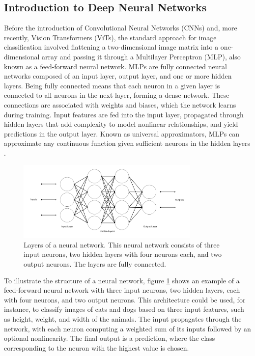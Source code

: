 
\subsection{Introduction to Deep Neural Networks}
\label{sec:intro_DNN}
Before the introduction of Convolutional Neural Networks (CNNs) and, more recently, Vision Transformers (ViTs), the standard approach for image classification involved flattening a two-dimensional image matrix into a one-dimensional array and passing it through a Multilayer Perceptron (MLP), also known as a feed-forward neural network. MLPs are fully connected neural networks composed of an input layer, output layer, and one or more hidden layers. Being fully connected means that each neuron in a given layer is connected to all neurons in the next layer, forming a dense network. These connections are associated with weights and biases, which the network learns during training. Input features are fed into the input layer, propagated through hidden layers that add complexity to model nonlinear relationships, and yield predictions in the output layer. Known as universal approximators, MLPs can approximate any continuous function given sufficient neurons in the hidden layers \cite{zhang2023dive,HORNIK1989359}.

\begin{figure}[ht]
    \centering
    \includegraphics[width=0.8\textwidth]{Images/cnn_layers.png} 
    \caption{Layers of a neural network. This neural network consists of three input neurons, two hidden layers with four neurons each, and two output neurons. The layers are fully connected.}
    \label{fig:dnn_layers}
\end{figure}

\noindent To illustrate the structure of a neural network, figure \ref{fig:dnn_layers} shows an example of a feed-forward neural network with three input neurons, two hidden layers, each with four neurons, and two output neurons. This architecture could be used, for instance, to classify images of cats and dogs based on three input features, such as height, weight, and width of the animals. The input propagates through the network, with each neuron computing a weighted sum of its inputs followed by an optional nonlinearity. The final output is a prediction, where the class corresponding to the neuron with the highest value is chosen.


